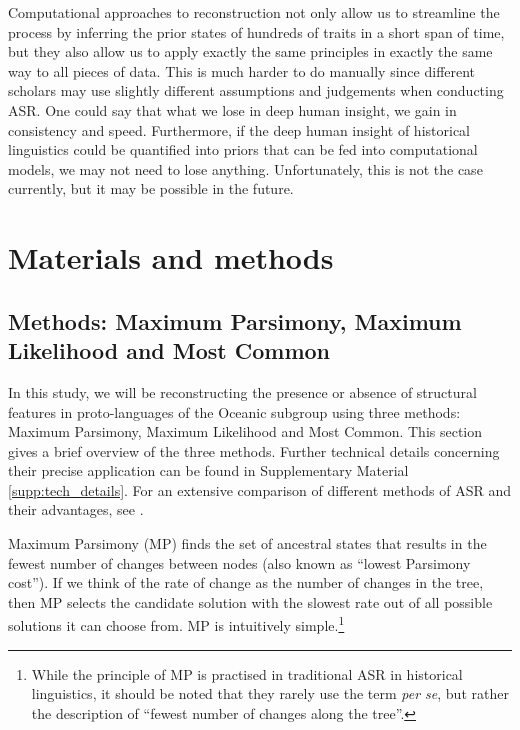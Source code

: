 \documentclass[12pt,letterpaper]{article}
\begin{document}

Computational approaches to reconstruction not only allow us to streamline the process by inferring the prior states of hundreds of traits in a short span of time, but they also allow us to apply exactly the same principles in exactly the same way to all pieces of data. This is much harder to do manually since different scholars may use slightly different assumptions and judgements when conducting ASR. One could say that what we lose in deep human insight, we gain in consistency and speed. Furthermore, if the deep human insight of historical linguistics could be quantified into priors that can be fed into computational models, we may not need to lose anything. Unfortunately, this is not the case currently, but it may be possible in the future.


\FloatBarrier
\section{Materials and methods}
\subsection{Methods: Maximum Parsimony, Maximum Likelihood and Most Common}
\label{sec:MP_ML_MC}
In this study, we will be reconstructing the presence or absence of structural features in proto-languages of the Oceanic subgroup using three methods: Maximum Parsimony, Maximum Likelihood and Most Common. This section gives a brief overview of the three methods. Further technical details concerning their precise application can be found in Supplementary Material \ref{supp:tech_details}. For an extensive comparison of different methods of ASR and their advantages, see \citet{joy2016ancestral}.

Maximum Parsimony (MP) finds the set of ancestral states that results in the fewest number of changes between nodes (also known as ``lowest Parsimony cost''). If we think of the rate of change as the number of changes in the tree, then MP selects the candidate solution with the slowest rate out of all possible solutions it can choose from. MP is intuitively simple.\footnote{While the principle of MP is practised in traditional ASR in historical linguistics, it should be noted that they rarely use the term \textit{per se}, but rather the description of ``fewest number of changes along the tree''.}
\end{document}
